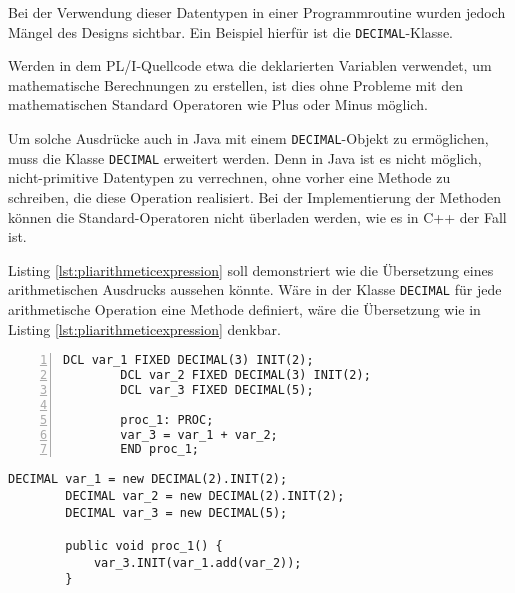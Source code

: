 
Bei der Verwendung dieser Datentypen in einer Programmroutine wurden jedoch Mängel des Designs sichtbar. Ein Beispiel hierfür ist die \verb+DECIMAL+-Klasse.

Werden in dem PL/I-Quellcode etwa die deklarierten Variablen verwendet, um mathematische Berechnungen zu erstellen, ist dies ohne Probleme mit den mathematischen Standard Operatoren wie Plus oder Minus möglich.

Um solche Ausdrücke auch in Java mit einem \verb+DECIMAL+-Objekt zu ermöglichen, muss die Klasse \verb+DECIMAL+ erweitert werden.
Denn in Java ist es nicht möglich, nicht-primitive Datentypen zu verrechnen, ohne vorher eine Methode zu schreiben, die diese Operation realisiert. 
Bei der Implementierung der Methoden können die Standard-Operatoren nicht überladen werden, wie es in C++ der Fall ist.

Listing \ref{lst:pliarithmeticexpression} soll demonstriert wie die Übersetzung eines arithmetischen Ausdrucks aussehen könnte.
Wäre in der Klasse \verb+DECIMAL+ für jede arithmetische Operation eine Methode definiert, wäre die Übersetzung wie in Listing \ref{lst:pliarithmeticexpression} denkbar.

\begin{minipage}[b]{0.48\linewidth}
	\centering
	\lstset{language=PL/I}
	\begin{lstlisting}[frame=single, numbers=left, mathescape,%
		caption={Transformation DECIMAL}, label={lst:pliarithmeticexpression}, basicstyle=\fontsize{9}{13}\selectfont\ttfamily]
		DCL var_1 FIXED DECIMAL(3) INIT(2);
		DCL var_2 FIXED DECIMAL(3) INIT(2);
		DCL var_3 FIXED DECIMAL(5);
		
		proc_1: PROC;
		var_3 = var_1 + var_2;
		END proc_1;
	\end{lstlisting}
\end{minipage}
\hspace{0.5cm}
\begin{minipage}[b]{0.48\linewidth}
	\centering
	\lstset{language=Java}
	\begin{lstlisting}[frame=single, mathescape,%
		title={" "}, basicstyle=\fontsize{9}{13}\selectfont\ttfamily]
		DECIMAL var_1 = new DECIMAL(2).INIT(2);
		DECIMAL var_2 = new DECIMAL(2).INIT(2);
		DECIMAL var_3 = new DECIMAL(5);
		
		public void proc_1() {
			var_3.INIT(var_1.add(var_2));
		}
	\end{lstlisting}
\end{minipage}

